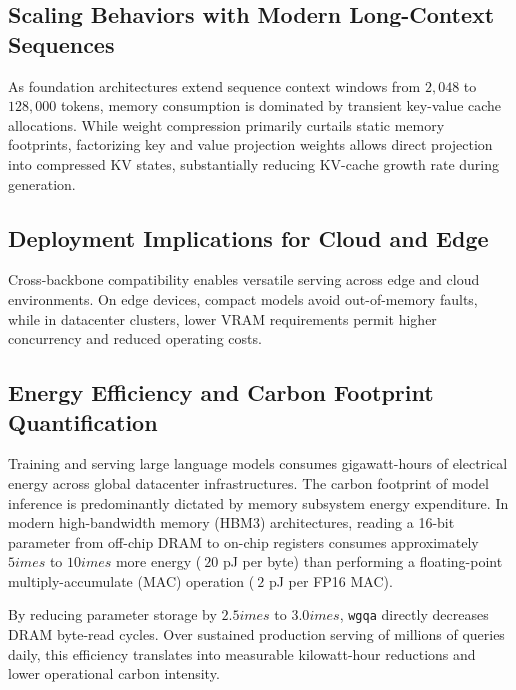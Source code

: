 \subsection{Scaling Behaviors with Modern Long-Context Sequences}
As foundation architectures extend sequence context windows from $2{,}048$ to $128{,}000$ tokens, memory consumption is dominated by transient key-value cache allocations. While weight compression primarily curtails static memory footprints, factorizing key and value projection weights allows direct projection into compressed KV states, substantially reducing KV-cache growth rate during generation.

\subsection{Deployment Implications for Cloud and Edge}
Cross-backbone compatibility enables versatile serving across edge and cloud environments. On edge devices, compact models avoid out-of-memory faults, while in datacenter clusters, lower VRAM requirements permit higher concurrency and reduced operating costs.

\subsection{Energy Efficiency and Carbon Footprint Quantification}
Training and serving large language models consumes gigawatt-hours of electrical energy across global datacenter infrastructures. The carbon footprint of model inference is predominantly dictated by memory subsystem energy expenditure. In modern high-bandwidth memory (HBM3) architectures, reading a 16-bit parameter from off-chip DRAM to on-chip registers consumes approximately $5	imes$ to $10	imes$ more energy ($~20$ pJ per byte) than performing a floating-point multiply-accumulate (MAC) operation ($~2$ pJ per FP16 MAC).

By reducing parameter storage by $2.5	imes$ to $3.0	imes$, \texttt{wgqa} directly decreases DRAM byte-read cycles. Over sustained production serving of millions of queries daily, this efficiency translates into measurable kilowatt-hour reductions and lower operational carbon intensity.
